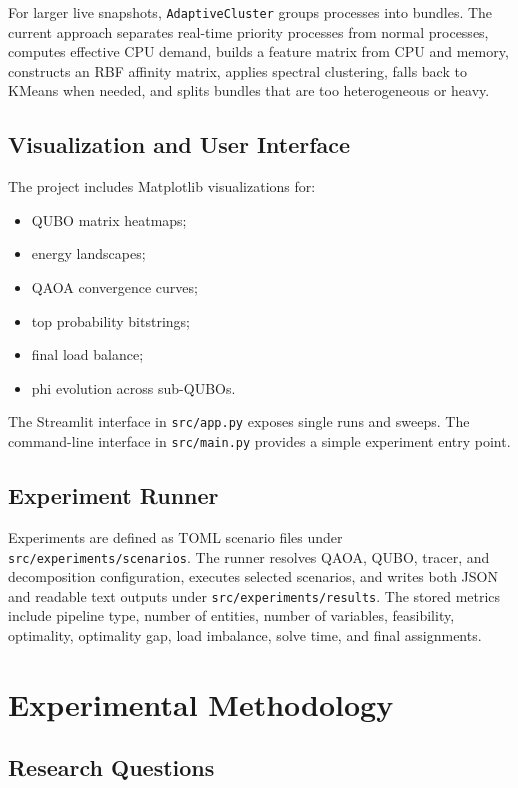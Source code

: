 \documentclass[12pt,a4paper,oneside]{report}
\begin{document}
For larger live snapshots, \texttt{AdaptiveCluster} groups processes into
bundles. The current approach separates real-time priority processes from normal
processes, computes effective CPU demand, builds a feature matrix from CPU and
memory, constructs an RBF affinity matrix, applies spectral clustering, falls
back to KMeans when needed, and splits bundles that are too heterogeneous or
heavy.

\section{Visualization and User Interface}

The project includes Matplotlib visualizations for:

\begin{itemize}
  \item QUBO matrix heatmaps;
  \item energy landscapes;
  \item QAOA convergence curves;
  \item top probability bitstrings;
  \item final load balance;
  \item phi evolution across sub-QUBOs.
\end{itemize}

The Streamlit interface in \texttt{src/app.py} exposes single runs and sweeps.
The command-line interface in \texttt{src/main.py} provides a simple
experiment entry point.

\section{Experiment Runner}

Experiments are defined as TOML scenario files under
\texttt{src/experiments/scenarios}. The runner resolves QAOA, QUBO, tracer, and
decomposition configuration, executes selected scenarios, and writes both JSON
and readable text outputs under \texttt{src/experiments/results}. The stored
metrics include pipeline type, number of entities, number of variables,
feasibility, optimality, optimality gap, load imbalance, solve time, and final
assignments.

\chapter{Experimental Methodology}
\label{chap:methodology}

\section{Research Questions}
\end{document}
